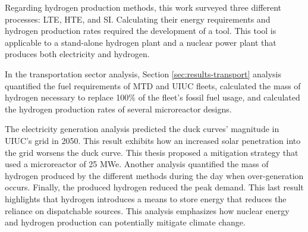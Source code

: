 Regarding hydrogen production methods, this work surveyed three different processes: \gls{LTE}, \gls{HTE}, and \gls{SI}.
Calculating their energy requirements and hydrogen production rates required the development of a tool.
This tool is applicable to a stand-alone hydrogen plant and a nuclear power plant that produces both electricity and hydrogen.

In the transportation sector analysis, Section \ref{sec:results-transport} analysis quantified the fuel requirements of \gls{MTD} and \gls{UIUC} fleets, calculated the mass of hydrogen necessary to replace 100$\%$ of the fleet's fossil fuel usage, and calculated the hydrogen production rates of several microreactor designs.

The electricity generation analysis predicted the duck curves' magnitude in UIUC's grid in 2050.
This result exhibits how an increased solar penetration into the grid worsens the duck curve.
This thesis proposed a mitigation strategy that used a microreactor of 25 MWe.
Another analysis quantified the mass of hydrogen produced by the different methods during the day when over-generation occurs.
Finally, the produced hydrogen reduced the peak demand.
This last result highlights that hydrogen introduces a means to store energy that reduces the reliance on dispatchable sources.
This analysis emphasizes how nuclear energy and hydrogen production can potentially mitigate climate change.
